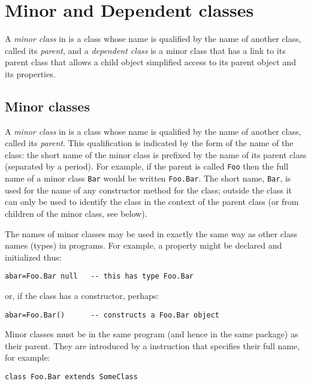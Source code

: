 \section{Minor and Dependent classes}\label{refminor}
 
A \emph{minor class} in \nr{} is a class whose name is qualified by
the name of another class, called its \emph{parent}, and a
\emph{dependent class} is a minor class that has a link to its parent
class that allows a child object simplified access to its parent
object and its properties.
\subsection{Minor classes}\label{refsminorc}
\index{,}
\index{,}
\index{,}
\index{,}
 
A \emph{minor class} in \nr{} is a class whose name is qualified by
the name of another class, called its \emph{parent}.
This qualification is indicated by the form of the name of the class:
the short name of the minor class is prefixed by the name of its parent
class (separated by a period).
For example, if the parent is called \texttt{Foo} then the full name of a
minor class \texttt{Bar} would be written \texttt{Foo.Bar}.
The short name, \texttt{Bar}, is used for the name of any constructor
method for the class; outside the class it can only be used to identify
the class in the context of the parent class (or from children of the
minor class, see below).
 
The names of minor classes may be used in exactly the same way as
other class names (types) in programs.  For example, a property might be
declared and initialized thus:
\begin{lstlisting}
abar=Foo.Bar null   -- this has type Foo.Bar
\end{lstlisting}
or, if the class has a constructor, perhaps:
\begin{lstlisting}
abar=Foo.Bar()      -- constructs a Foo.Bar object
\end{lstlisting}
 
Minor classes must be in the same program (and hence in the same
package) as their parent.  They are introduced by a 
instruction that specifies their full name, for example:
\begin{lstlisting}
class Foo.Bar extends SomeClass
\end{lstlisting}
 
